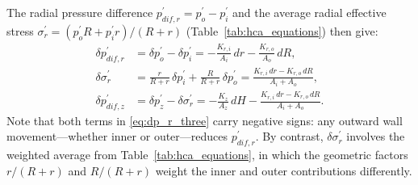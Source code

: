 The radial pressure difference $p_{dif,r}^{\prime}=p_o^{\prime}-p_i^{\prime}$ and the average radial effective stress $\sigma_r^{\prime}=({p_o^{\prime}R+p_i^{\prime}r})/({R+r})$ (Table~\ref{tab:hca_equations}) then give:
\begin{align}
\delta p_{dif,r}^{\prime}
  &= \delta p_o^{\prime}-\delta p_i^{\prime}
   = -\frac{K_{r,i}}{A_i}\,dr - \frac{K_{r,o}}{A_o}\,dR, \label{eq:dp_r_three}\\[6pt]
\delta\sigma_r^{\prime}
  &= \frac{r}{R+r}\,\delta p_i^{\prime} + \frac{R}{R+r}\,\delta p_o^{\prime}
   = \frac{K_{r,i}\,dr - K_{r,o}\,dR}{A_i+A_o}, \label{eq:dsigma_r_three}\\[6pt]
\delta p_{dif,z}^{\prime}
  &= \delta p_z^{\prime}-\delta\sigma_r^{\prime}
   = -\frac{K_z}{A_z}\,dH - \frac{K_{r,i}\,dr - K_{r,o}\,dR}{A_i+A_o}. \label{eq:dp_z_three}
\end{align}
Note that both terms in \cref{eq:dp_r_three} carry negative signs: any outward wall movement---whether inner or outer---reduces $p_{dif,r}^{\prime}$. By contrast, $\delta\sigma_r^{\prime}$ involves the weighted average from Table~\ref{tab:hca_equations}, in which the geometric factors $r/(R+r)$ and $R/(R+r)$ weight the inner and outer contributions differently.

